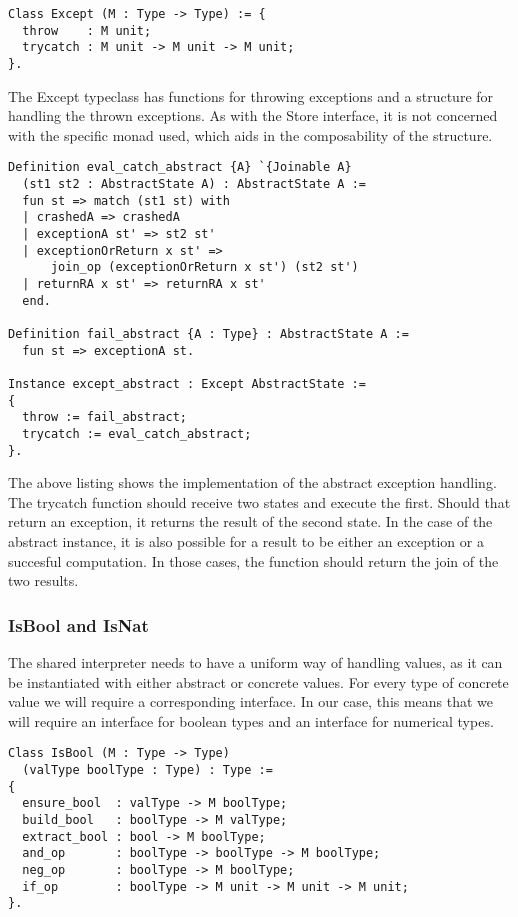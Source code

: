 \begin{verbatim}
Class Except (M : Type -> Type) := {
  throw    : M unit;
  trycatch : M unit -> M unit -> M unit;
}.
\end{verbatim}

The Except typeclass has functions for throwing exceptions and a structure for
handling the thrown exceptions. As with the Store interface, it is not
concerned with the specific monad used, which aids in the composability of the
structure. 

\begin{verbatim}
Definition eval_catch_abstract {A} `{Joinable A} 
  (st1 st2 : AbstractState A) : AbstractState A :=
  fun st => match (st1 st) with
  | crashedA => crashedA 
  | exceptionA st' => st2 st'
  | exceptionOrReturn x st' => 
      join_op (exceptionOrReturn x st') (st2 st')
  | returnRA x st' => returnRA x st'
  end.

Definition fail_abstract {A : Type} : AbstractState A :=
  fun st => exceptionA st.

Instance except_abstract : Except AbstractState := 
{
  throw := fail_abstract;
  trycatch := eval_catch_abstract;
}.
\end{verbatim}

The above listing shows the implementation of the abstract exception handling.
The trycatch function should receive two states and execute the first. Should
that return an exception, it returns the result of the second state. In the
case of the abstract instance, it is also possible for a result to be either
an exception or a succesful computation. In those cases, the function should
return the join of the two results.

\subsubsection{IsBool and IsNat}
The shared interpreter needs to have a uniform way of handling values, as it
can be instantiated with either abstract or concrete values. For every type of
concrete value we will require a corresponding interface. In our case, this
means that we will require an interface for boolean types and an interface for
numerical types.

\begin{verbatim}
Class IsBool (M : Type -> Type)
  (valType boolType : Type) : Type :=
{
  ensure_bool  : valType -> M boolType;
  build_bool   : boolType -> M valType;
  extract_bool : bool -> M boolType;
  and_op       : boolType -> boolType -> M boolType;
  neg_op       : boolType -> M boolType;
  if_op        : boolType -> M unit -> M unit -> M unit;
}.
\end{verbatim}

